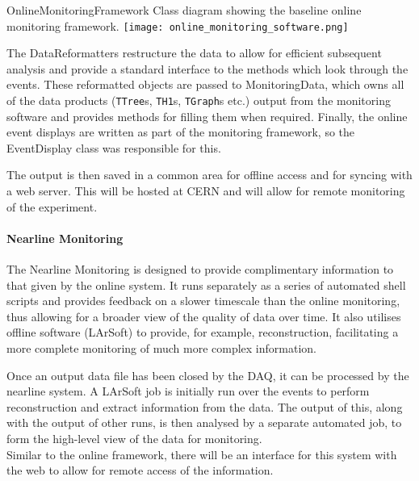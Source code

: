 \begin{cdrfigure}{OnlineMonitoringFramework}{
    Class diagram showing the baseline online monitoring framework. 
    }
  \texttt{[image: online\_monitoring\_software.png]}
\end{cdrfigure}

The DataReformatters restructure the data to allow for efficient subsequent
analysis and provide a standard interface to the methods which look through
the events.  These reformatted objects are passed to MonitoringData, which
owns all of the data products (\texttt{TTree}s, \texttt{TH1}s, \texttt{TGraph}s
etc.) output from the monitoring software and provides methods for filling
them when required.  Finally, the online event displays are
written as part of the monitoring framework, so the EventDisplay class was
responsible for this.  

The output is then saved in a common area for offline access and for syncing
with a web server. This will be hosted at CERN and will allow for remote
monitoring of the experiment.

\paragraph{Nearline Monitoring}

The Nearline Monitoring is designed to provide complimentary information to
that given by the online system. It runs separately as a series of automated
shell scripts and provides feedback on a slower timescale than the online
monitoring, thus allowing for a broader view of the quality of data over time.
It also utilises offline software (LArSoft) to provide, for example,
reconstruction, facilitating a more complete monitoring of much more complex
information.

Once an output data file has been closed by the DAQ, it can be processed by the
nearline system.  A LArSoft job is initially run over the events to perform
reconstruction and extract information from the data.  The output of this,
along with the output of other runs, is then analysed by a separate automated
job, to form the high-level view of the data for monitoring.\\
%
Similar to the online framework, there will be an interface for this system
with the web to allow for remote access of the information.

